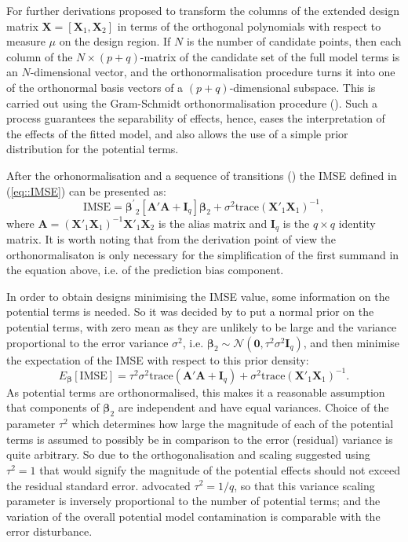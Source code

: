 For further derivations \citet{Kobilinsky1998} proposed to transform the columns of the extended design matrix $\bm{X}=[\bm{X}_1,\bm{X}_2]$ in terms of the orthogonal polynomials with respect to measure $\mu$ on the design region. If $N$ is the number of candidate points, then each column of the $N\times(p+q)$-matrix of the candidate set of the full model terms is an $N$-dimensional vector, and the orthonormalisation procedure turns it into one of the orthonormal basis vectors of a $(p+q)$-dimensional subspace. This is carried out using the Gram-Schmidt orthonormalisation procedure (\citealp{Meyer2000}). Such a process guarantees the separability of effects, hence, eases the interpretation of the effects of the fitted model, and also allows the use of a simple prior distribution for the potential terms. 

After the orhonormalisation and a sequence of transitions (\citealp{Goos2005model}) the IMSE defined in (\ref{eq::IMSE}) can be presented as:
\begin{equation*}
\mbox{IMSE}=\bm{\beta^{'}}_{2}[\bm{A}'\bm{A}+\bm{I}_{q}]\bm{\beta}_2+\sigma^{2}\mbox{trace}(\bm{X}'_{1}\bm{X}_1)^{-1},
\end{equation*}   
where $\bm{A}=(\bm{X}'_{1}\bm{X}_1)^{-1}\bm{X}'_{1}\bm{X}_2$ is the alias matrix and $\bm{I}_{q}$ is the $q\times q$ identity matrix. It is worth noting that from the derivation point of view the orthonormalisaton is only necessary for the simplification of the first summand in the equation above, i.e. of the prediction bias component.

In order to obtain designs minimising the IMSE value, some information on the potential terms is needed. So it was decided by \citet{Kobilinsky1998} to put a normal prior on the potential terms, with zero mean as they are unlikely to be large and the variance proportional to the error variance $\sigma^2$, i.e. $\bm{\beta}_2\sim \mathcal{N}(\bm{0},\tau^{2}\sigma^{2}\bm{I}_{q})$, and then minimise the expectation of the IMSE with respect to this prior density:
\begin{equation*}
E_{\bm{\beta}}[\mbox{IMSE}]=\tau^{2}\sigma^{2}\mbox{trace}(\bm{A}'\bm{A}+\bm{I}_{q})+\sigma^{2}\mbox{trace}(\bm{X}'_{1}\bm{X}_{1})^{-1}.
\end{equation*}
As potential terms are orthonormalised, this makes it a reasonable assumption that components of $\bm{\beta}_2$ are independent and have equal variances. Choice of the parameter $\tau^{2}$ which determines how large the magnitude of each of the potential terms is assumed to possibly be in comparison to the error (residual) variance is quite arbitrary. So due to the orthogonalisation and scaling \citet{DuMouchel1994} suggested using $\tau^{2}=1$ that would signify the magnitude of the potential effects should not exceed the residual standard error. \citet{Kobilinsky1998} advocated $\tau^{2}=1/q$, so that this variance scaling parameter is inversely proportional to the number of potential terms; and the variation of the overall potential model contamination is comparable with the error disturbance.  

